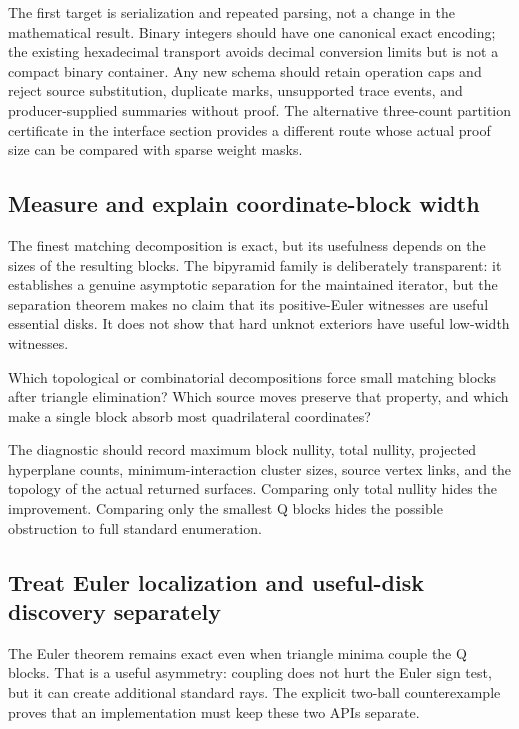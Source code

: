 The first target is serialization and repeated parsing, not a change in the
mathematical result.  Binary integers should have one canonical exact encoding;
the existing hexadecimal transport avoids decimal conversion limits but is
not a compact binary container.  Any new schema should retain operation caps
and reject source substitution, duplicate marks, unsupported trace events,
and producer-supplied summaries without proof.  The alternative three-count
partition certificate in the interface section provides a different route
whose actual proof size can be compared with sparse weight masks.

\subsection{Measure and explain coordinate-block width}

The finest matching decomposition is exact, but its usefulness depends on the
sizes of the resulting blocks.  The bipyramid family is deliberately transparent:
it establishes a genuine asymptotic separation for the maintained iterator,
but the separation theorem makes no claim that its positive-Euler witnesses
are useful essential disks.  It does not
show that hard unknot exteriors have useful low-width witnesses.

\begin{question}
Which topological or combinatorial decompositions force small matching blocks
after triangle elimination?  Which source moves preserve that property, and
which make a single block absorb most quadrilateral coordinates?
\end{question}

The diagnostic should record maximum block nullity, total nullity, projected
hyperplane counts, minimum-interaction cluster sizes, source vertex links,
and the topology of the actual returned surfaces.  Comparing only total
nullity hides the improvement.  Comparing only the smallest Q blocks hides
the possible obstruction to full standard enumeration.

\subsection{Treat Euler localization and useful-disk discovery separately}

The Euler theorem remains exact even when triangle minima couple the Q
blocks.  That is a useful asymmetry: coupling does not hurt the Euler sign
test, but it can create additional standard rays.  The explicit two-ball
counterexample proves that an implementation must keep these two APIs separate.

